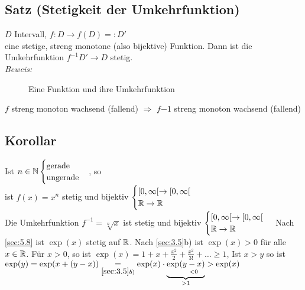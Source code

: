 \subsection{Satz (Stetigkeit der Umkehrfunktion)}\label{sec:5.14}
$D$ Intervall, $f : D \to f(D) =: D'$\\
eine stetige, streng monotone (also bijektive) Funktion. Dann ist die Umkehrfunktion $f^{-1} D' \to D$ stetig.\\
{\em Beweis:} \cite{k5}
\begin{figure}[h!]
\centering
{}
\caption{Eine Funktion und ihre Umkehrfunktion}
\end{figure}
$f$ streng monoton wachsend (fallend) $\Rightarrow$ $f{-1}$ streng monoton wachsend (fallend)
\subsection{Korollar}
Ist $n \in \mathbb{N} \begin{cases}
\text{gerade}\\
\text{ungerade}
\end{cases}$, so \\
ist $f(x) = x^n$ stetig und bijektiv $\begin{cases}
[0,\infty[ \to [0, \infty[\\
\mathbb{R} \to \mathbb{R}
\end{cases}$\\
Die Umkehrfunktion $f^{-1} = \sqrt[n]{x}$ ist stetig und bijektiv $\begin{cases}
[0,\infty[ \to [0, \infty[\\
\mathbb{R} \to \mathbb{R}
\end{cases}$
Nach \ref{sec:5.8} ist $\exp(x)$ stetig auf $\mathbb{R}$. Nach \ref{sec:3.5}b) ist $\exp(x) > 0$ für alle $x \in \mathbb{R}$. Für $x > 0$, so ist $\exp(x) = 1 + x + \frac{x^2}{2} + \frac{x^2}{3!} + \ldots \geq 1$, Ist $ x > y$ so ist $\exp(y) = \exp(x + (y-x)) \underset{\ref{sec:3.5}b)}{=} \exp(x) \cdot \underbrace{\exp(\underset{<0}{y-x)}}_{> 1} > \exp(x)$\\
